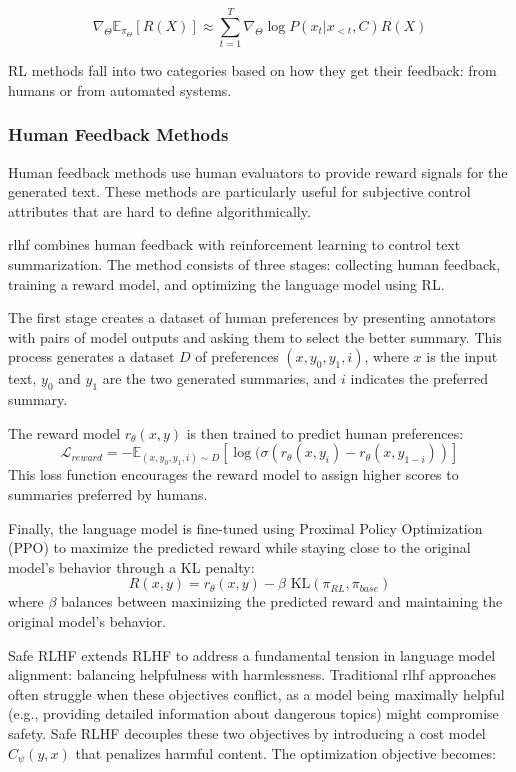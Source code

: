 \begin{equation}
   \nabla_\Theta \mathbb{E}_{\pi_\Theta}[R(X)] \approx \sum_{t=1}^T \nabla_\Theta \log P(x_t|x_{<t}, C) R(X)
\end{equation}

RL methods fall into two categories based on how they get their feedback: from humans or from automated systems.

\subsubsection{Human Feedback Methods}

Human feedback methods use human evaluators to provide reward signals for the generated text.
These methods are particularly useful for subjective control attributes that are hard to define algorithmically.

\gls{rlhf} \cite{stiennon2022learningsummarizehumanfeedback} combines human feedback with reinforcement learning to control text summarization.
The method consists of three stages: collecting human feedback, training a reward model, and optimizing the language model using RL.

The first stage creates a dataset of human preferences by presenting annotators with pairs of model outputs and asking them to select the better summary.
This process generates a dataset $D$ of preferences $(x, y_0, y_1, i)$, where $x$ is the input text, $y_0$ and $y_1$ are the two generated summaries, and $i$ indicates the preferred summary.

The reward model $r_\theta(x, y)$ is then trained to predict human preferences:
\begin{equation}
    \mathcal{L}_{reward} = -\mathbb{E}_{(x,y_0,y_1,i)\sim D}[\log(\sigma(r_\theta(x, y_i) - r_\theta(x, y_{1-i}))]
\end{equation}
This loss function encourages the reward model to assign higher scores to summaries preferred by humans.

Finally, the language model is fine-tuned using Proximal Policy Optimization (PPO) to maximize the predicted reward while staying close to the original model's behavior through a KL penalty:
\begin{equation}
    R(x, y) = r_\theta(x, y) - \beta \text{ KL}(\pi_{RL}, \pi_{base})
\end{equation}
where $\beta$ balances between maximizing the predicted reward and maintaining the original model's behavior.

Safe RLHF \cite{dai2023saferlhfsafereinforcement} extends RLHF to address a fundamental tension in language model alignment: balancing helpfulness with harmlessness. 
Traditional \gls{rlhf} approaches often struggle when these objectives conflict, as a model being maximally helpful (e.g., providing detailed information about dangerous topics) might compromise safety.
Safe RLHF decouples these two objectives by introducing a cost model $C_\psi(y, x)$ that penalizes harmful content. The optimization objective becomes:

